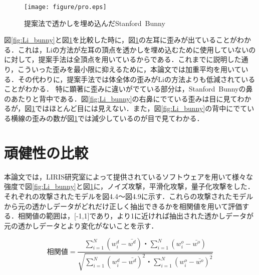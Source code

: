 \documentclass[11pt]{jreport}
\begin{document}
{\newpage



\begin{figure}[htbp]
  \begin{center}
    \texttt{[image: figure/pro.eps]}%
  \end{center}
  \caption{提案法で透かしを埋め込んだStanford\ Bunny}
  \label{fig:me}
\end{figure}




図\ref{fig:Li_bunny}と図\ref{fig:me}を比較した時に，図\ref{fig:me}の左耳に歪みが出ていることがわかる．これは，Liの方法が左耳の頂点を透かしを埋め込むために使用していないのに対して，提案手法は全頂点を用いているからである．これまでに説明した通り，こういった歪みを最小限に抑えるために，本論文では加重平均を用いている．その代わりに，提案手法では体全体の歪みがLiの方法よりも低減されていることがわかる．
特に顕著に歪みに違いがでている部分は，Stanford\ Bunnyの鼻のあたりと背中である．図\ref{fig:Li_bunny}の右鼻にでている歪みは目に見てわかるが，図\ref{fig:me}ではほとんど目には見えない．また，図\ref{fig:Li_bunny}の背中にでている横線の歪みの数が図\ref{fig:me}では減少しているのが目で見てわかる．







\newpage

\section{頑健性の比較}
本論文では，LIRIS研究室によって提供されているソフトウェア\cite{benchmark}を用いて様々な強度で図\ref{fig:Li_bunny}と図\ref{fig:me}に，ノイズ攻撃，平滑化攻撃，量子化攻撃をした．それぞれの攻撃されたモデルを図4.4～図4.9に示す．これらの攻撃されたモデルから元の透かしデータがどれだけ正しく抽出できるかを相関値を用いて評価する．相関値の範囲は，[-1,1]であり，より1に近ければ抽出された透かしデータが元の透かしデータとより変化がないことを示す．\par

\begin{equation}
相関値=\frac{\sum_{i=1}^N (w_i^d-\bar{w^d})・\sum_{i=1}^N (w_i^o-\bar{w^o})}{\sqrt{\sum_{i=1}^N (w_i^d-\bar{w^d})^2・\sum_{i=1}^N (w_i^o-\bar{w^o})^2}}
\end{equation}


}
\end{document}
